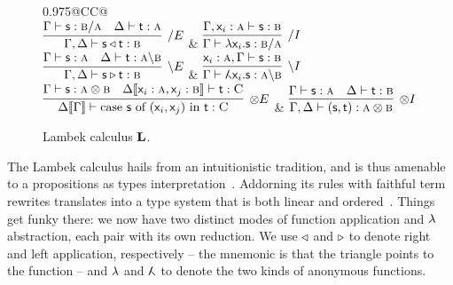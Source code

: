 \begin{figure}
	\centering
	\begin{tabularx}{0.975\textwidth}{@{}CC@{}}
		\\[2em]
		$\infer[\divright E]{\Gamma, \Delta \vdash \term{s}\appright\term{t}: \prop{b}}{\Gamma \vdash  \term{s}: \prop{b} \divright \prop{a} & \Delta \vdash \term{t}: \prop{a}}$
		& 
		$\infer[\divright I]{\Gamma \vdash \term{\lam \vari .s}: \prop{b} \divright \prop{a}}{\Gamma, \term{\vari }: \prop{a} \vdash \term{s}: \prop{b}}$\\[2em]
		$\infer[\divleft E]{\Gamma, \Delta \vdash \term{s}\appleft\term{t}:\prop{b}}{\Gamma \vdash \term{s}:\prop{a} & \Delta \vdash \term{t}:\prop{a}\divleft\prop{b}}$
		& 
		$\infer[\divleft I]{\Gamma \vdash \term{\adbmal \vari .s}: \prop{a} \divleft \prop{b}}{\term{\vari }: \prop{a}, \Gamma \vdash \term{s}: \prop{b}}$\\[2em]
		$\infer[\otimes E]{\Delta\ctx{\Gamma} \vdash \cterm{case \term{s} of \term{(\vari , \varj)} in \term{t}}: \prop C}{
			\Gamma \vdash \term{s}: \prop{a}\otimes\prop{b}
			&
			\Delta\ctx{\term{\vari }: \prop{a}, \term{\varj}: \prop{b}}  \vdash \term{t}: \prop C}$
		&
		$\infer[\otimes I]{\Gamma,\Delta \vdash \term{(s,t)}: \prop{a} \otimes \prop{b}}{\Gamma \vdash \term{s}: \prop{a} & \Delta \vdash \term{t}: \prop{b}}$\\[2em]
	\end{tabularx}
	\caption{Lambek calculus $\textbf{L}$.}
	\label{figure:lambek_calculus_rules}
\end{figure}

The Lambek calculus hails from an intuitionistic tradition, and is thus amenable to a propositions as types interpretation~\cite{wansing1990formulas}.
Addorning its rules with faithful term rewrites translates into a type system that is both linear and ordered~\cite{pierce2004advanced}.
Things get funky there: we now have two distinct modes of function application and $\mathnormal{\lambda}$ abstraction, each pair with its own reduction.
We use $\triangleleft$ and $\triangleright$ to denote right and left application, respectively -- the mnemonic is that the triangle points to the function -- and $\mathnormal{\lambda}$ and $\adbmal$ to denote the two kinds of anonymous functions.

